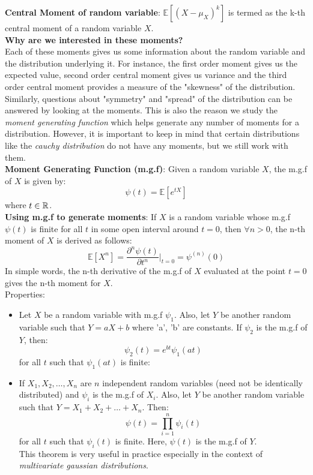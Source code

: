 \documentclass[english, 11pt]{article}
\begin{document}
{\bf Central Moment of random variable}: $\mathbb{E}[(X - \mu_X)^k]$ is termed as the k-th central moment of a random variable $X$.\\

{\bf Why are we interested in these moments?} \\
Each of these moments gives us some information about the random variable and the distribution underlying it. For instance, the first order moment gives us the expected value, second order central moment gives us variance and the third order central moment provides a measure of the "skewness" of the distribution. Similarly, questions about "symmetry" and "spread" of the distribution can be answered by looking at the moments. This is also the reason we study the {\it moment generating function} which helps generate any number of moments for a distribution. However, it is important to keep in mind that certain distributions like the {\it cauchy distribution} do not have any moments, but we still work with them. \\

{\bf Moment Generating Function (m.g.f)}: Given a random variable $X$, the m.g.f of $X$ is given by:
\[ \psi (t) = \mathbb{E}[e^{t X}] \]
where $t \in {\mathbb{R}}$.\\

{\bf Using m.g.f to generate moments}: If $X$ is a random variable whose m.g.f $\psi (t)$ is finite for all $t$ in some open interval around $t=0$, then $\forall n > 0$, the n-th moment of $X$ is derived as follows:
\[ \mathbb{E} [X^n] = \frac{\partial^n \psi (t) }{\partial t^n} \bigg|_{t=0} = \psi^{(n)} (0)\]
In simple words, the n-th derivative of the m.g.f of $X$ evaluated at the point $t=0$ gives the n-th moment for $X$.\\

Properties:
\begin{itemize}
\item Let $X$ be a random variable with m.g.f $\psi_1$. Also, let $Y$ be another random variable such that $Y = aX + b$ where 'a', 'b' are constants. If $\psi_2$ is the m.g.f of $Y$, then: 
\[ \psi_2 (t) = e^{bt} \psi_1 (at) \]
for all $t$ such that $\psi_1 (a t)$ is finite:

\item If $X_1, X_2, \ldots, X_n$ are $n$ independent random variables (need not be identically distributed) and $\psi_i$ is the m.g.f of $X_i$. Also, let $Y$ be another random variable such that $Y = X_1 + X_2 + \ldots + X_n$. Then:
\[ \psi (t) = \prod_{i=1}^n \psi_i (t) \]
for all $t$ such that $\psi_i (t)$ is finite. Here, $\psi (t)$ is the m.g.f of $Y$. \\
This theorem is very useful in practice especially in the context of {\it multivariate gaussian distributions}.
\end{itemize}
\end{document}
